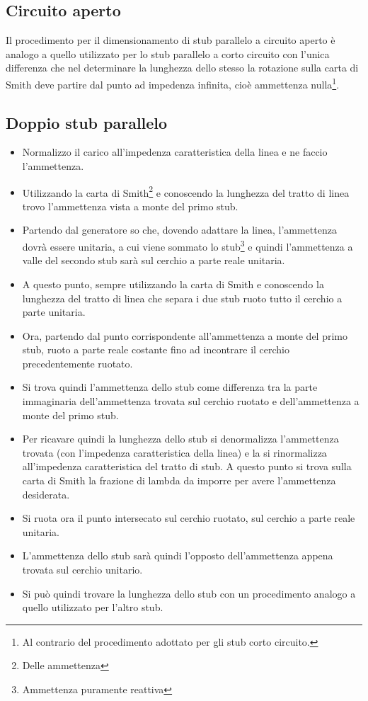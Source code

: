 \documentclass[10pt,a4paper]{report}
\begin{document}
		\subsection{Circuito aperto}

		Il procedimento per il dimensionamento di stub parallelo a circuito aperto è analogo a quello utilizzato per lo stub parallelo a corto circuito con l'unica differenza che nel determinare la lunghezza dello stesso la rotazione sulla carta di Smith deve partire dal punto ad impedenza infinita, cioè ammettenza nulla\footnote{Al contrario del procedimento adottato per gli stub corto circuito.}.



		\subsection{Doppio stub parallelo}

			\begin{itemize}
			
			\item Normalizzo il carico all'impedenza caratteristica della linea e ne faccio l'ammettenza.
			\item Utilizzando la carta di Smith\footnote{Delle ammettenza} e conoscendo la lunghezza del tratto di linea trovo l'ammettenza vista a monte del primo stub.  
			\item Partendo dal generatore so che, dovendo adattare la linea, l'ammettenza dovrà essere unitaria, a cui viene sommato lo stub\footnote{Ammettenza puramente reattiva} e quindi l'ammettenza a valle del secondo stub sarà sul cerchio a parte reale unitaria.  
			\item A questo punto, sempre utilizzando la carta di Smith e conoscendo la lunghezza del tratto di linea che separa i due stub ruoto tutto il cerchio a parte unitaria.
			\item Ora, partendo dal punto corrispondente all'ammettenza a monte del primo stub, ruoto a parte reale costante fino ad incontrare il cerchio precedentemente ruotato.
			\item Si trova quindi l'ammettenza dello stub come differenza tra la parte immaginaria dell'ammettenza trovata sul cerchio ruotato e dell'ammettenza a monte del primo stub. 
			\item Per ricavare quindi la lunghezza dello stub si denormalizza l'ammettenza trovata (con l'impedenza caratteristica della linea) e la si rinormalizza all'impedenza caratteristica del tratto di stub. A questo punto si trova sulla carta di Smith la frazione di lambda da imporre per avere l'ammettenza desiderata.  
			\item Si ruota ora il punto intersecato sul cerchio ruotato, sul cerchio a parte reale unitaria.
			\item L'ammettenza dello stub sarà quindi l'opposto dell'ammettenza appena trovata sul cerchio unitario.
			\item Si può quindi trovare la lunghezza dello stub con un procedimento analogo a quello utilizzato per l'altro stub.
			
			\end{itemize}
\end{document}
